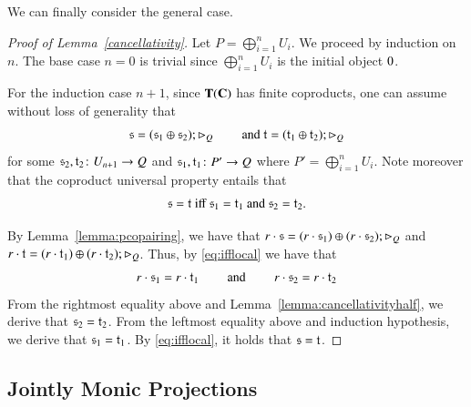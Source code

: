 We can finally consider the general case.

\begin{proof}[Proof of Lemma~\ref{cancellativity}]
Let $P=\bigoplus_{i=1}^n U_i$. We proceed by induction on $n$. The base case $n=0$ is trivial since $\bigoplus_{i=1}^n U_i$ is the initial object $0$.

For the induction case $n+1$, since $\mathbf{T}(\mathbf{C})$ has finite coproducts, one can assume without loss of generality that
\begin{equation}\label{eq:s1s2coproduct}
\mathfrak{s} = (\mathfrak{s}_1 \oplus \mathfrak{s}_2) ; \rhd_{Q} \qquad \text{ and } \mathfrak{t} = (\mathfrak{t}_1 \oplus \mathfrak{t}_2) ; \rhd_{Q}
\end{equation}
for some $\mathfrak{s}_2,\mathfrak{t}_2 \colon U_{n+1} \to Q$ and  $\mathfrak{s}_1,\mathfrak{t}_1\colon P' \to Q$ where $P'=\bigoplus_{i=1}^n U_i$. Note moreover that the coproduct universal property entails that
\begin{equation}\label{eq:ifflocal}
\mathfrak{s}=\mathfrak{t} \text{ iff } \mathfrak{s}_1=\mathfrak{t}_1 \text{ and } \mathfrak{s}_2=\mathfrak{t}_2\text{.}
\end{equation}

By Lemma~\ref{lemma:pcopairing}, we have that
$r \cdot \mathfrak{s} = (r\cdot \mathfrak{s}_1 ) \oplus (r\cdot  \mathfrak{s}_2 ); \rhd_{Q}$ and $r \cdot \mathfrak{t} = (r\cdot \mathfrak{t}_1 ) \oplus (r\cdot  \mathfrak{t}_2 ); \rhd_{Q} $. Thus, by \eqref{eq:ifflocal} we have that
 \[r\cdot \mathfrak{s}_1= r\cdot \mathfrak{t}_1 \qquad \text{ and }\qquad r\cdot \mathfrak{s}_2= r\cdot \mathfrak{t}_2 \]
 From the rightmost equality above and Lemma~\ref{lemma:cancellativityhalf}, we derive that $\mathfrak{s}_2=\mathfrak{t}_2$. From the leftmost equality above and induction hypothesis, we derive that $\mathfrak{s}_1=\mathfrak{t}_1$. By \eqref{eq:ifflocal}, it holds that $\mathfrak{s}=\mathfrak{t}$.
 \end{proof}



\subsection{Jointly Monic Projections}




